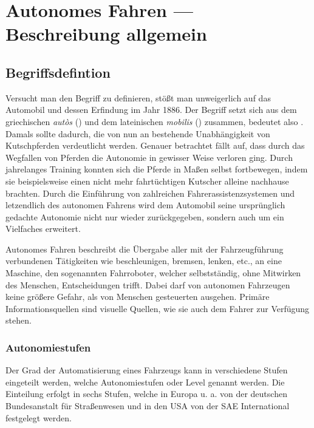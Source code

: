 \chapter{Autonomes Fahren --- Beschreibung allgemein}
\section{Begriffsdefintion}
Versucht man den Begriff  zu definieren, stößt man unweigerlich auf das Automobil und dessen Erfindung im Jahr 1886. Der Begriff  setzt sich aus dem griechischen \textit{autòs} () und dem lateinischen \textit{mobilis} () zusammen, bedeutet also . Damals sollte dadurch, die von nun an bestehende Unabhängigkeit von Kutschpferden verdeutlicht werden. Genauer betrachtet fällt auf, dass durch das Wegfallen von Pferden die Autonomie in gewisser Weise verloren ging. Durch jahrelanges Training konnten sich die Pferde in Maßen selbst fortbewegen, indem sie beispielsweise einen nicht mehr fahrtüchtigen Kutscher alleine nachhause brachten.
Durch die Einführung von zahlreichen Fahrerassistenzsystemen und letzendlich des autonomen Fahrens wird dem Automobil seine ursprünglich gedachte Autonomie nicht nur wieder zurückgegeben, sondern auch um ein Vielfaches erweitert.

Autonomes Fahren beschreibt die Übergabe aller mit der Fahrzeugführung verbundenen Tätigkeiten wie beschleunigen, bremsen, lenken, etc., an eine Maschine, den sogenannten Fahrroboter, welcher selbstständig, ohne Mitwirken des Menschen, Entscheidungen trifft. Dabei darf von autonomen Fahrzeugen keine größere Gefahr, als von Menschen gesteuerten ausgehen. Primäre Informationsquellen sind visuelle Quellen, wie sie auch dem Fahrer zur Verfügung stehen.


\subsection{Autonomiestufen}
Der Grad der Automatisierung eines Fahrzeugs kann in verschiedene Stufen eingeteilt werden, welche Autonomiestufen oder Level genannt werden. Die Einteilung erfolgt in sechs Stufen, welche in Europa u. a. von der deutschen Bundesanstalt für Straßenwesen und in den USA von der SAE International festgelegt werden.



